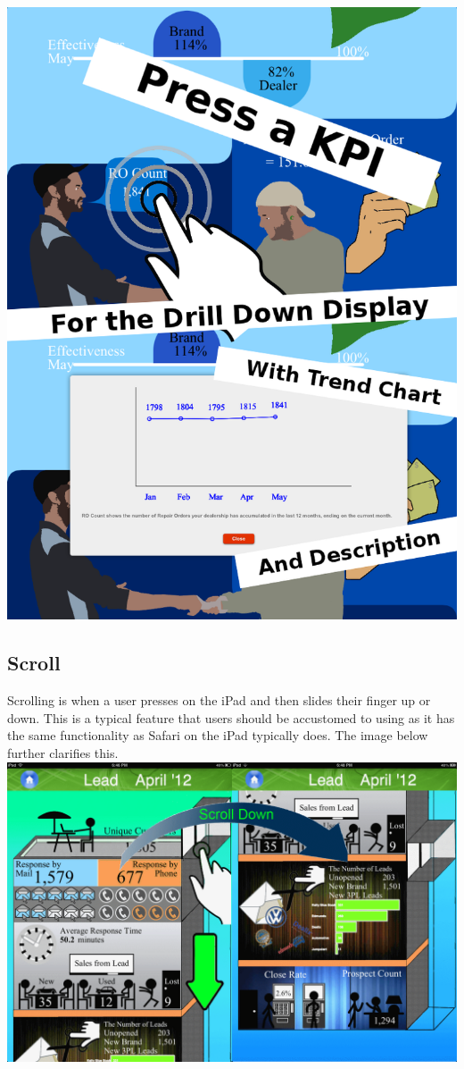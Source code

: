 \documentclass[11pt,a4paper,oneside]{article}
\begin{document}
\includegraphics[width=.9\textwidth]{images/fun.png}\\   

\subsection{Scroll}
Scrolling is when a user presses on the iPad and then slides their finger up or down. This is a typical feature that users should be accustomed to using as it has the same functionality as Safari on the iPad typically does. The image below further clarifies this.\\

\includegraphics[width=1\textwidth]{images/IMG_02.png}\\   
\end{document}
